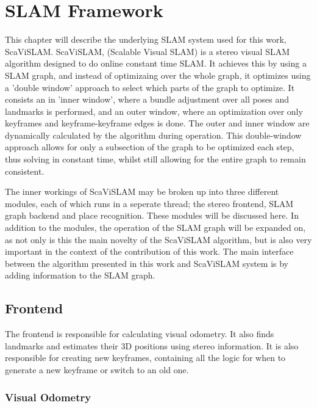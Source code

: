 \chapter{SLAM Framework}
\label{chapter:ScaViSLAM}

This chapter will describe the underlying SLAM system used for this work, ScaViSLAM.  ScaViSLAM, (Scalable Visual SLAM) is a stereo visual SLAM algorithm designed to do online constant time SLAM. It achieves this by using a SLAM graph, and instead of optimizaing over the whole graph, it optimizes using a 'double window' approach to select which parts of the graph to optimize.  It consists an in 'inner window', where a bundle adjustment over all poses and landmarks is performed, and an outer window, where an optimization over only keyframes and keyframe-keyframe edges is done. The outer and inner window are dynamically calculated by the algorithm during operation.  This double-window approach allows for only a subsection of the graph to be optimized each step, thus solving in constant time, whilst still allowing for the entire graph to remain consistent.

The inner workings of ScaViSLAM may be broken up into three different modules, each of which runs in a seperate thread; the stereo frontend, SLAM graph backend and place recognition. These modules will be discussed here. In addition to the modules, the operation of the SLAM graph will be expanded on, as not only is this the main novelty of the ScaViSLAM algorithm, but is also very important in the context of the contribution of this work. The main interface between the algorithm presented in this work and ScaViSLAM system is by adding information to the SLAM graph.

\section{Frontend}
\label{sec:scavislam_frontend}

The frontend is responsible for calculating visual odometry.  It also finds landmarks and estimates their 3D positions using stereo information.  It is also responsible for creating new keyframes, containing all the logic for when to generate a new keyframe or switch to an old one. 

\subsection{Visual Odometry}


